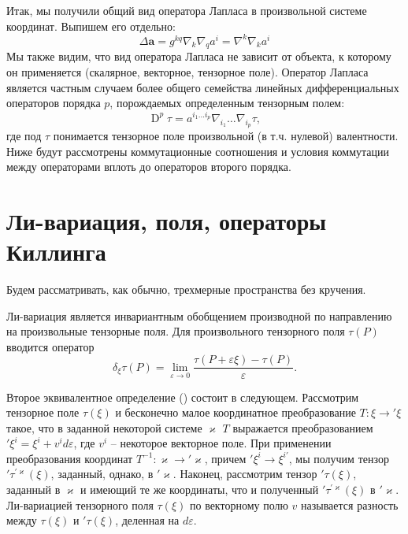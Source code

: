 \documentclass[12pt,a4paper]{article}
\DeclareMathOperator{\D}{D}
\newcommand{\V}[1]{\mathbf{#1}}
\begin{document}
        Итак, мы получили общий вид оператора Лапласа в произвольной системе координат. Выпишем его отдельно:
        \begin{equation}
            \Delta{\V{a}} = g^{kq} \nabla_k \nabla_{q} a^i
                          = \nabla^k \nabla_k a^i
        \end{equation}
        Мы также видим, что вид оператора Лапласа не зависит от объекта, к которому он применяется (скалярное, векторное, тензорное поле). Оператор Лапласа является частным случаем более общего семейства линейных дифференциальных операторов порядка $p$, порождаемых определенным тензорным полем:
        \begin{equation}
            \D^p\tau = a^{i_1 \dots i_p} \nabla_{i_1} \dots \nabla_{i_p} \tau ,
        \end{equation}
        где под $\tau$ понимается тензорное поле произвольной (в т.ч. нулевой) валентности. Ниже будут рассмотрены коммутационные соотношения и условия коммутации между операторами вплоть до операторов второго порядка.


    \section{Ли-вариация, поля, операторы Киллинга}

        Будем рассматривать, как обычно, трехмерные пространства без кручения.

        Ли-вариация является инвариантным обобщением производной по направлению на произвольные тензорные поля. Для произвольного тензорного поля $\tau(P)$ вводится оператор
        \begin{equation}
            \delta_\xi \tau(P) = \lim\limits_{\varepsilon \to 0} \frac{
                \tau(P + \varepsilon \xi) - \tau(P)
            }{\varepsilon}.
        \end{equation}

        Второе эквивалентное определение (\cite{lie_derivative_theory}) состоит в следующем. Рассмотрим тензорное поле $\tau(\xi)$ и бесконечно малое координатное преобразование $T: \xi \rightarrow {'\xi}$ такое, что в заданной некоторой системе $\varkappa$ $T$ выражается преобразованием $'\xi^i = \xi^i + v^i d\varepsilon$, где $v^i$ -- некоторое векторное поле. При применении преобразования координат $T^{-1}: \varkappa \rightarrow {'\varkappa}$, причем $'\xi^i \rightarrow \xi^{i'}$, мы получим тензор $'\tau^{'\varkappa}(\xi)$, заданный, однако, в $'\varkappa$. Наконец, рассмотрим тензор $'\tau(\xi)$, заданный в $\varkappa$ и имеющий те же координаты, что и полученный $'\tau^{'\varkappa}(\xi)$ в $'\varkappa$. Ли-вариацией тензорного поля $\tau(\xi)$ по векторному полю $v$ называется разность между $\tau(\xi)$ и $'\tau(\xi)$, деленная на $d\varepsilon$.
\end{document}
